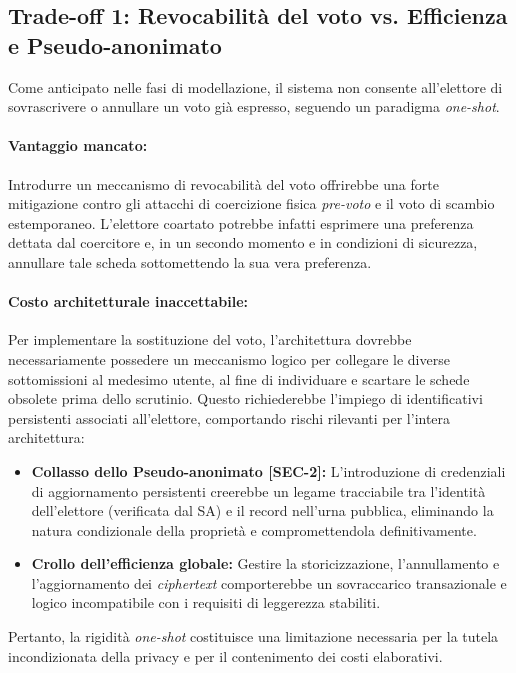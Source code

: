 \subsection{Trade-off 1: Revocabilità del voto vs. Efficienza e Pseudo-anonimato}
\label{subsec:3.4.1_tradeoff_revocabilita}

Come anticipato nelle fasi di modellazione, il sistema non consente all'elettore di sovrascrivere o annullare un voto già espresso, seguendo un paradigma \textit{one-shot}.

\paragraph{Vantaggio mancato:} Introdurre un meccanismo di revocabilità del voto offrirebbe una forte mitigazione contro gli attacchi di coercizione fisica \textit{pre-voto} e il voto di scambio estemporaneo. L'elettore coartato potrebbe infatti esprimere una preferenza dettata dal coercitore e, in un secondo momento e in condizioni di sicurezza, annullare tale scheda sottomettendo la sua vera preferenza.

\paragraph{Costo architetturale inaccettabile:} Per implementare la sostituzione del voto, l'architettura dovrebbe necessariamente possedere un meccanismo logico per collegare le diverse sottomissioni al medesimo utente, al fine di individuare e scartare le schede obsolete prima dello scrutinio. Questo richiederebbe l'impiego di identificativi persistenti associati all'elettore, comportando rischi rilevanti per l'intera architettura:
\begin{itemize}
    \item \textbf{Collasso dello Pseudo-anonimato [SEC-2]:} L'introduzione di credenziali di aggiornamento persistenti creerebbe un legame tracciabile tra l'identità dell'elettore (verificata dal SA) e il record nell'urna pubblica, eliminando la natura condizionale della proprietà e compromettendola definitivamente.
    \item \textbf{Crollo dell'efficienza globale:} Gestire la storicizzazione, l'annullamento e l'aggiornamento dei \textit{ciphertext} comporterebbe un sovraccarico transazionale e logico incompatibile con i requisiti di leggerezza stabiliti.
\end{itemize}
Pertanto, la rigidità \textit{one-shot} costituisce una limitazione necessaria per la tutela incondizionata della privacy e per il contenimento dei costi elaborativi.

